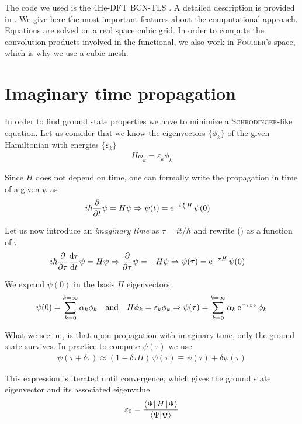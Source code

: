 \label{sec:ANX}
The code we used is the 4He-DFT BCN-TLS \cite{BCNcode}.
A detailed description is provided in \cite{DFTguide}. 
We give here the most important features about the computational approach. 
Equations are solved on a real space cubic grid.
In order to compute the convolution products involved in the functional, we also work in \textsc{Fourier}'s space, which is why we use a cubic mesh. 

\section{Imaginary time propagation}
\label{sec:ANX-itp}

In order to find ground state properties we have to minimize a \textsc{Schrödinger}-like equation. 
Let us consider that we know the eigenvectors $\{\phi_k\}$ of the given Hamiltonian with energies $\{\varepsilon_k\}$
\begin{align}
H \phi_k = \varepsilon_k \phi_k 
\end{align}

Since $H$ does not depend on time, one can formally write the propagation in time of a given $\psi$ as
\begin{align}
\label{eq:ITP}
i\hbar \pdv{t} \psi &= H\psi \Rightarrow \psi(t) = \mathrm{e}^{-i\frac{t}{\hbar} H} \, \psi(0)
\end{align}

Let us now introduce an \textit{imaginary time} as $\tau = i t/\hbar$ and rewrite () as a function of $\tau$
\begin{align}
i\hbar \pdv{\tau} \dv{\tau}{t} \psi &= H \psi \Rightarrow \pdv{\tau} \psi = - H \psi \Rightarrow \psi(\tau) = \mathrm{e}^{- \tau H } \, \psi(0)
\end{align}

We expand $\psi(0)$ in the basis $H$ eigenvectors
\begin{align}
\psi(0) = \sum_{k=0}^{k=\infty} \alpha_k \phi_k \quad \text{and} \quad H \phi_k = \varepsilon_k \phi_k \Rightarrow \psi(\tau) = \sum_{k=0}^{k=\infty} \alpha_k \, \mathrm{e}^{-\tau \varepsilon_k }  \, \phi_k 
\label{eq:ITP-dead}
\end{align}

What we see in , is that upon propagation with  imaginary time, only the ground state survives. In practice to compute $\psi(\tau)$ we use 
\begin{align}
\psi(\tau+\delta \tau) \approx (1-\delta \tau H) \, \psi(\tau) \equiv \psi(\tau) + \delta \psi(\tau)
\end{align}

This expression is iterated until convergence, which gives the ground state eigenvector and  its associated eigenvalue
\begin{align}
\varepsilon_0 = \frac{\bra{\Psi}H\ket{\Psi}}{\braket{\Psi}{\Psi}}
\end{align}


